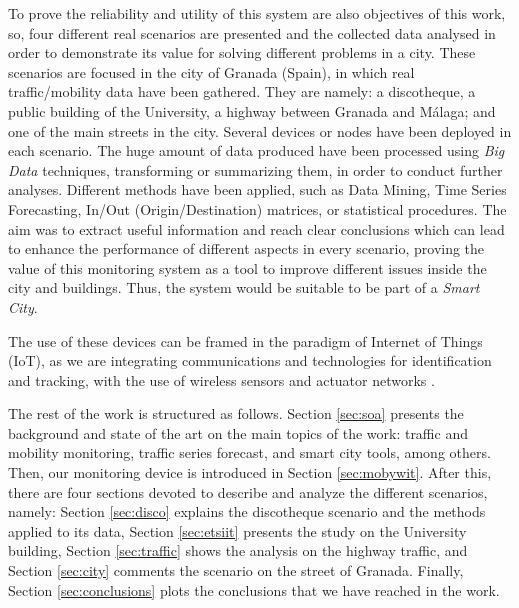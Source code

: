 \documentclass[preprint]{elsarticle}
\begin{document}
To prove the reliability and utility of this system are also objectives of this work, so, four different real scenarios are presented and the collected data analysed in order to demonstrate its value for solving different problems in a city. These scenarios are focused in the city of Granada (Spain), in which real traffic/mobility data have been gathered. They are namely: a discotheque, a public building of the University, a highway between Granada and Málaga; and one of the main streets in the city.  
Several devices or nodes have been deployed in each scenario.
The huge amount of data produced have been processed using \textit{Big Data} 
techniques, transforming or summarizing them, in order to conduct
further analyses. Different methods have been applied, such as Data
Mining, Time Series Forecasting, In/Out (Origin/Destination) matrices,
or statistical procedures. %
The aim was to extract useful information and reach clear conclusions
which can lead to enhance the performance of different aspects in every scenario, proving the value of this monitoring system as a
tool to improve different issues inside the city and buildings. Thus,
the system would be suitable to be part of a \textit{Smart City}. 


The use of these devices can be framed in the paradigm of Internet of
Things (IoT), as we are integrating communications and technologies
for identification and tracking, with the use of wireless sensors and
actuator networks \cite{Atzori2010IoTSurvey}. 

The rest of the work is structured as follows. Section \ref{sec:soa}
presents the background and state of the art on the main topics of the
work: traffic and mobility monitoring, traffic series forecast, and
smart city tools, among others. 
Then, our monitoring device is introduced in Section \ref{sec:mobywit}.
After this, there are four sections devoted to describe and analyze the different scenarios, namely: Section \ref{sec:disco} explains the discotheque scenario and the methods applied to its data, Section \ref{sec:etsiit} presents the study on the University building, Section \ref{sec:traffic} shows the analysis on the highway traffic, and Section \ref{sec:city} comments the scenario on the street of Granada.
Finally, Section \ref{sec:conclusions} plots the conclusions that we
have reached in the work. 
\end{document}
